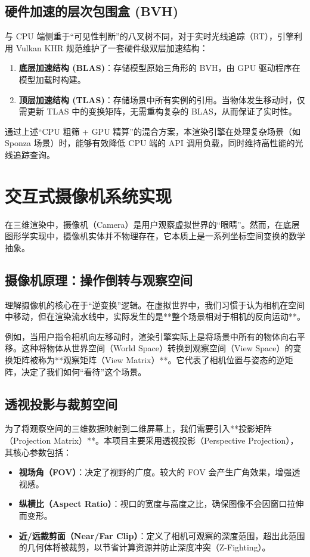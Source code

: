 \subsection{硬件加速的层次包围盒 (BVH)}
与 CPU 端侧重于“可见性判断”的八叉树不同，对于实时光线追踪（RT），引擎利用 Vulkan KHR 规范维护了一套硬件级双层加速结构：
\begin{enumerate}
    \item \textbf{底层加速结构 (BLAS)}：存储模型原始三角形的 BVH，由 GPU 驱动程序在模型加载时构建。
    \item \textbf{顶层加速结构 (TLAS)}：存储场景中所有实例的引用。当物体发生移动时，仅需更新 TLAS 中的变换矩阵，无需重构复杂的 BLAS，从而保证了实时性。
\end{enumerate}

通过上述“CPU 粗筛 + GPU 精算”的混合方案，本渲染引擎在处理复杂场景（如 Sponza 场景）时，能够有效降低 CPU 端的 API 调用负载，同时维持高性能的光线追踪查询。

\section{交互式摄像机系统实现}

在三维渲染中，摄像机（Camera）是用户观察虚拟世界的“眼睛”。然而，在底层图形学实现中，摄像机实体并不物理存在，它本质上是一系列坐标空间变换的数学抽象。

\subsection{摄像机原理：操作倒转与观察空间}
理解摄像机的核心在于“逆变换”逻辑。在虚拟世界中，我们习惯于认为相机在空间中移动，但在渲染流水线中，实际发生的是**整个场景相对于相机的反向运动**。

例如，当用户指令相机向左移动时，渲染引擎实际上是将场景中所有的物体向右平移。这种将物体从世界空间（World Space）转换到观察空间（View Space）的变换矩阵被称为**观察矩阵（View Matrix）**。它代表了相机位置与姿态的逆矩阵，决定了我们如何“看待”这个场景。

\subsection{透视投影与裁剪空间}
为了将观察空间的三维数据映射到二维屏幕上，我们需要引入**投影矩阵（Projection Matrix）**。本项目主要采用透视投影（Perspective Projection），其核心参数包括：
\begin{itemize}
    \item \textbf{视场角（FOV）}：决定了视野的广度。较大的 FOV 会产生广角效果，增强透视感。
    \item \textbf{纵横比（Aspect Ratio）}：视口的宽度与高度之比，确保图像不会因窗口拉伸而变形。
    \item \textbf{近/远裁剪面（Near/Far Clip）}：定义了相机可观察的深度范围，超出此范围的几何体将被裁剪，以节省计算资源并防止深度冲突（Z-Fighting）。
\end{itemize}


